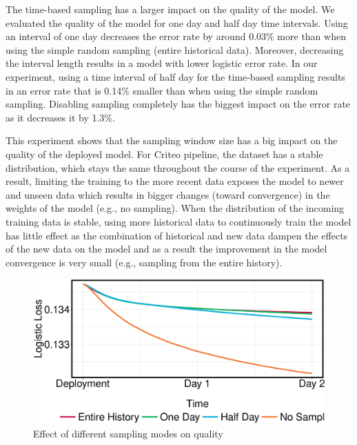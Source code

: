 The time-based sampling has a larger impact on the quality of the model.
We evaluated the quality of the model for one day and half day time intervals.
Using an interval of one day decreases the error rate by around 0.03\% more than when using the simple random sampling (entire historical data).
Moreover, decreasing the interval length results in a model with lower logistic error rate.
In our experiment, using a time interval of half day for the time-based sampling results in an error rate that is 0.14\% smaller than when using the simple random sampling. 
Disabling sampling completely has the biggest impact on the error rate as it decreases it by 1.3\%.

This experiment shows that the sampling window size has a big impact on the quality of the deployed model.
For Criteo pipeline, the dataset has a stable distribution, which stays the same throughout the course of the experiment.
As a result, limiting the training to the more recent data exposes the model to newer and unseen data which results in bigger changes (toward convergence) in the weights of the model (e.g., no sampling).
When the distribution of the incoming training data is stable, using more historical data to continuously train the model has little effect as the combination of historical and new data dampen the effects of the new data on the model and as a result the improvement in the model convergence is very small (e.g., sampling from the entire history).

\begin{figure}[h!]
\centering
\includegraphics[width=\columnwidth]{../images/experiment-results/criteo-sampling-mode-experiments.eps}
\caption{Effect of different sampling modes on quality}
\label{fig:sampling-mode-quality}
\vspace{2mm}
\end{figure}

